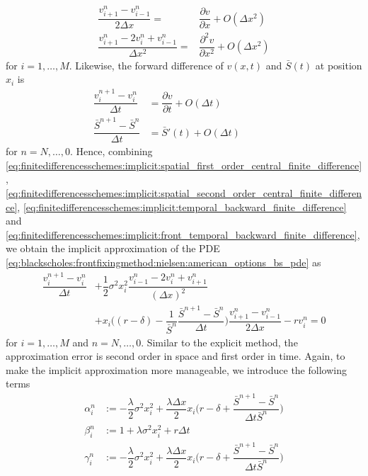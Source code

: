 \begin{align}
  \label{eq:finitedifferencesschemes:implicit:spatial_first_order_central_finite_difference}
  \dfrac{v^{n}_{i+1} - v^{n}_{i-1}}{2 \Delta{x}} =& \dfrac{\partial{v}}{\partial{x}}+ O(\Delta{x}^2) \\
  \label{eq:finitedifferencesschemes:implicit:spatial_second_order_central_finite_difference}
  \dfrac{v^{n}_{i+1} - 2v^{n}_{i} + v^{n}_{i-1}}{\Delta{x}^2} =& \dfrac{\partial^2{v}}{\partial{x^2}}+ O(\Delta{x}^2)
\end{align}
for $i = 1, \dots, M$. Likewise, the forward difference of $v(x, t)$ and $\bar{S}(t)$ at position $x_i$ is  
\begin{align}
  \label{eq:finitedifferencesschemes:implicit:temporal_backward_finite_difference}
  \dfrac{v^{n+1}_{i} - v^{n}_{i}}{\Delta{t}} &= \dfrac{\partial{v}}{\partial{t}}+ O(\Delta{t}) \\
  \label{eq:finitedifferencesschemes:implicit:front_temporal_backward_finite_difference}
  \dfrac{\bar{S}^{n+1}-\bar{S}^{n}}{\Delta t} &= \bar{S}'(t) + O(\Delta{t}) \qquad & \text{ }
\end{align}
for $n = N,\dots,0$. Hence, combining \eqref{eq:finitedifferencesschemes:implicit:spatial_first_order_central_finite_difference}, \eqref{eq:finitedifferencesschemes:implicit:spatial_second_order_central_finite_difference}, \eqref{eq:finitedifferencesschemes:implicit:temporal_backward_finite_difference} and \eqref{eq:finitedifferencesschemes:implicit:front_temporal_backward_finite_difference},we obtain the implicit approximation of the PDE \eqref{eq:blackscholes:frontfixingmethod:nielsen:american_options_bs_pde} as
\begin{equation*}
  \begin{split}
    \dfrac{v^{n+1}_{i} - v^{n}_{i}}{\Delta{t}} & + \dfrac{1}{2}\sigma^2 x_i^2 \dfrac{v^{n}_{i-1} - 2v^{n}_{i} + v^{n}_{i+1}}{(\Delta{x})^2} \\ 
     & + x_i\bigg( (r-\delta) - \dfrac{1}{\bar{S}^{n}}\dfrac{\bar{S}^{n+1} - \bar{S}^{n}}{\Delta{t}} \bigg)\dfrac{v^{n}_{i+1} - v^{n}_{i-1}}{2\Delta{x}} - rv^{n}_{i} = 0
  \end{split}
\end{equation*}
for $i=1,\dots,M$ and $n=N,\dots,0$. Similar to the explicit method, the approximation error is second order in space and first order in time. Again, to make the implicit  approximation more manageable, we introduce the following terms  
\begin{align}
  \alpha^{n}_{i} &:= -\dfrac{\lambda}{2}\sigma^2x^{2}_{i} + \dfrac{\lambda\Delta{x}}{2}x_{i}\bigg(r-\delta+\dfrac{\bar{S}^{n+1}-\bar{S}^n}{\Delta{t}\bar{S}^{n}}\bigg) \\
  \beta^{n}_{i} &:= 1 + \lambda\sigma^2x^{2}_{i} + r\Delta{t} \\
  \gamma^{n}_{i} &:= -\dfrac{\lambda}{2}\sigma^2x^{2}_{i} + \dfrac{\lambda\Delta{x}}{2}x_{i}\bigg(r-\delta+\dfrac{\bar{S}^{n+1}-\bar{S}^n}{\Delta{t}\bar{S}^{n}}\bigg)
\end{align}
